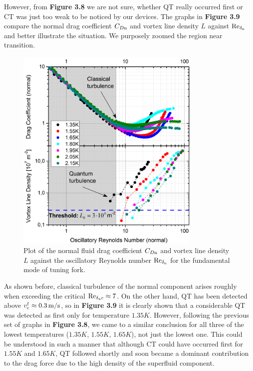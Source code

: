 However, from {\sffamily\textbf{Figure 3.8}} we are not sure, whether QT really occurred first or CT was just too weak to be noticed by our devices. The graphs in {\sffamily\textbf{Figure 3.9}} compare the normal drag coefficient $ C_{D\mathrm{n}} $ and vortex line density $ L $ against $ \text{Re}_{\delta_{\mathrm{n}}} $ and better illustrate the situation. We purposely zoomed the region near transition.


\begin{figure}[h!]
	\centering
	\includegraphics[width=0.8\textwidth]{graphs/Merged_C+L_Ren_fund}
	\caption{Plot of the normal fluid drag coefficient $ C_{D\mathrm{n}} $ and vortex line density $ L $ against the oscillatory Reynolds number $ \text{Re}_{\delta_{\mathrm{n}}} $ for the fundamental mode of tuning fork.}
\end{figure}

As shown before, classical turbulence of the normal component arises roughly when exceeding the critical $ \text{Re}_{\delta_{\mathrm{n}}c} \approx 7$. On the other hand, QT has been detected above $ v_{\mathrm{c}}^{\mathrm{f}} \approx 0.3 \,\mathrm{m/s}$, so in {\sffamily\textbf{Figure 3.9}} it is clearly shown that a considerable QT was detected as first only for temperature $ 1.35 \unit{K} $. However, following the previous set of graphs in {\sffamily\textbf{Figure 3.8}}, we came to a similar conclusion for all three of the lowest temperatures ($ 1.35 \unit{K} $, $ 1.55 \unit{K} $, $ 1.65 \unit{K} $), not just the lowest one. This could be understood in such a manner that although CT could have occurred first for $ 1.55 \unit{K} $ and $ 1.65 \unit{K} $, QT followed shortly and soon became a dominant contribution to the drag force due to the high density of the superfluid component.

